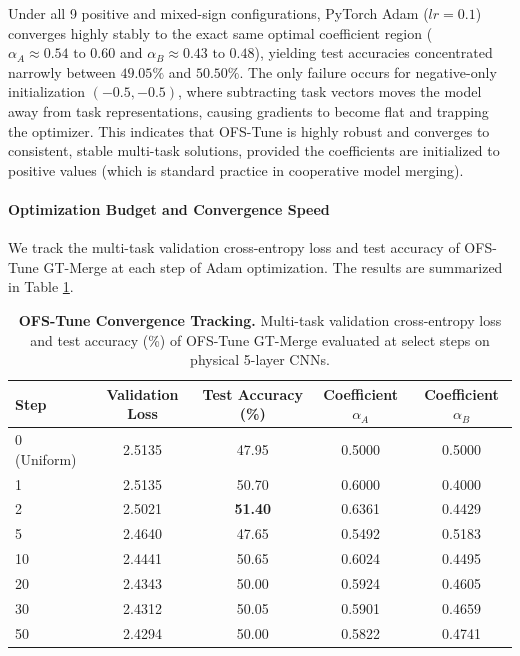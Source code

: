\documentclass{article}
\theoremstyle{plain}
\theoremstyle{definition}
\theoremstyle{remark}
\begin{document}
Under all 9 positive and mixed-sign configurations, PyTorch Adam ($lr=0.1$) converges highly stably to the exact same optimal coefficient region ($\alpha_A \approx 0.54 \text{ to } 0.60$ and $\alpha_B \approx 0.43 \text{ to } 0.48$), yielding test accuracies concentrated narrowly between $49.05\%$ and $50.50\%$. The only failure occurs for negative-only initialization $(-0.5, -0.5)$, where subtracting task vectors moves the model away from task representations, causing gradients to become flat and trapping the optimizer. This indicates that OFS-Tune is highly robust and converges to consistent, stable multi-task solutions, provided the coefficients are initialized to positive values (which is standard practice in cooperative model merging).

\paragraph{Optimization Budget and Convergence Speed}
We track the multi-task validation cross-entropy loss and test accuracy of OFS-Tune GT-Merge at each step of Adam optimization. The results are summarized in Table \ref{tab:budget_results}.

\begin{table}[htbp]
\caption{\textbf{OFS-Tune Convergence Tracking.} Multi-task validation cross-entropy loss and test accuracy (\%) of OFS-Tune GT-Merge evaluated at select steps on physical 5-layer CNNs.}
\label{tab:budget_results}
\vskip 0.1in
\begin{center}
\begin{small}
\begin{sc}
\begin{tabular}{lcccc}
\toprule
Step & Validation Loss & Test Accuracy (\%) & Coefficient $\alpha_A$ & Coefficient $\alpha_B$ \\
\midrule
0 (Uniform) & 2.5135 & 47.95 & 0.5000 & 0.5000 \\
1 & 2.5135 & 50.70 & 0.6000 & 0.4000 \\
2 & 2.5021 & \textbf{51.40} & 0.6361 & 0.4429 \\
5 & 2.4640 & 47.65 & 0.5492 & 0.5183 \\
10 & 2.4441 & 50.65 & 0.6024 & 0.4495 \\
20 & 2.4343 & 50.00 & 0.5924 & 0.4605 \\
30 & 2.4312 & 50.05 & 0.5901 & 0.4659 \\
50 & 2.4294 & 50.00 & 0.5822 & 0.4741 \\
\bottomrule
\end{tabular}
\end{sc}
\end{small}
\end{center}
\vskip -0.1in
\end{table}
\end{document}
